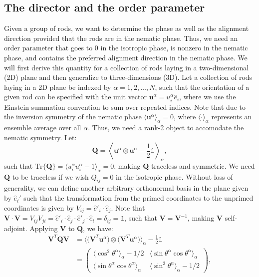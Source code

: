 \subsection{The director and the order parameter}
Given a group of rods, we want to determine the phase as well as the alignment direction provided that the rods are in the nematic phase.
Thus, we need an order parameter that goes to $0$ in the isotropic phase, is nonzero in the nematic phase, and contains the preferred alignment direction in the nematic phase.
We will first derive this quantity for a collection of rods laying in a two-dimensional (2D) plane and then generalize to three-dimensions (3D).
Let a collection of rods laying in a 2D plane be indexed by $\alpha = 1,2,\dots, N$, such that the orientation of a given rod can be specified with the unit vector $\mathbf{u}^{\alpha} = u^{\alpha}_i\hat{e}_i$, where we use the Einstein summation convention to sum over repeated indices.
Note that due to the inversion symmetry of the nematic phase $\langle \mathbf{u}^{\alpha}\rangle_{\alpha} = 0$, where $\langle \cdot \rangle_{\alpha}$ represents an ensemble average over all $\alpha$.
Thus, we need a rank-2 object to accomodate the nematic symmetry.
Let:
\begin{equation}
  \mathbf{Q} = \left \langle \mathbf{u}^{\alpha} \otimes \mathbf{u}^{\alpha} - \frac{1}{2} \mathbb{1} \right \rangle_{\alpha},\label{e:2-2DOrderRaw}
\end{equation}
such that $\textrm{Tr}\big \{ \mathbf{Q} \big \} = \langle u^{\alpha}_i u^{\alpha}_i - 1 \rangle_{\alpha} = 0$, making $\mathbf{Q}$ traceless and symmetric.
We need $\mathbf{Q}$ to be traceless if we wish $Q_{ij} = 0$ in the isotropic phase.
Without loss of generality, we can define another arbitrary orthonormal basis in the plane given by $\hat{e}_i'$ such that the transformation from the primed coordinates to the unprimed coordinates is given by $V_{ij} = \hat{e}'_i \cdot \hat{e}_j$.
Note that $\mathbf{V} \cdot \mathbf{V} = V_{ij}V_{ji} = \hat{e}'_i \cdot \hat{e}_j \cdot \hat{e}'_j \cdot \hat{e}_i = \delta_{ij} = \mathbb{1}$, such that $\mathbf{V} = \mathbf{V}^{-1}$, making $\mathbf{V}$ self-adjoint.
Applying $\mathbf{V}$ to $\mathbf{Q}$, we have:
\begin{align}
  \mathbf{V}^T \mathbf{Q} \mathbf{V} &=
  \bigg \langle \big ( \mathbf{V}^T \mathbf{u}^{\alpha} \big ) \otimes \big ( \mathbf{V}^T \mathbf{u}^{\alpha} \big )\bigg \rangle_{\alpha}  - \frac{1}{2} \mathbb{1} \nonumber \\ & =
  \begin{pmatrix}
    \langle \cos^2 \theta^{\alpha}\rangle_{\alpha} - 1/2 & \langle \sin \theta^{\alpha} \cos \theta^{\alpha} \rangle_{\alpha} \\
    \langle \sin \theta^{\alpha} \cos \theta^{\alpha} \rangle_{\alpha} & \langle \sin^2 \theta^{\alpha} \rangle_{\alpha} - 1/2
  \end{pmatrix},\label{e:2-2DOrderRot}
\end{align}
